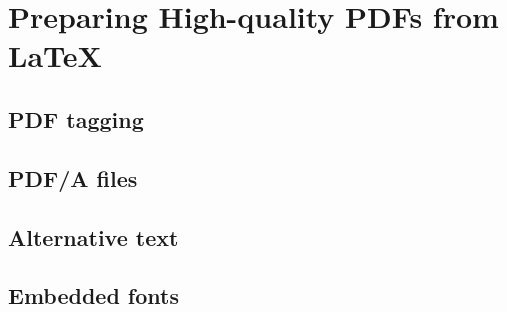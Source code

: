 \chapter{Preparing High-quality PDFs from LaTeX}\label{sec:PDFPrep}


\section{PDF tagging}\label{sec:PDFPrep_Tagging}


\section{PDF/A files}\label{sec:PDFPrep_PDFx}


\section{Alternative text}\label{sec:PDFPrep_AltText}


\section{Embedded fonts}\label{sec:PDFPrep_EmbeddedFonts}
